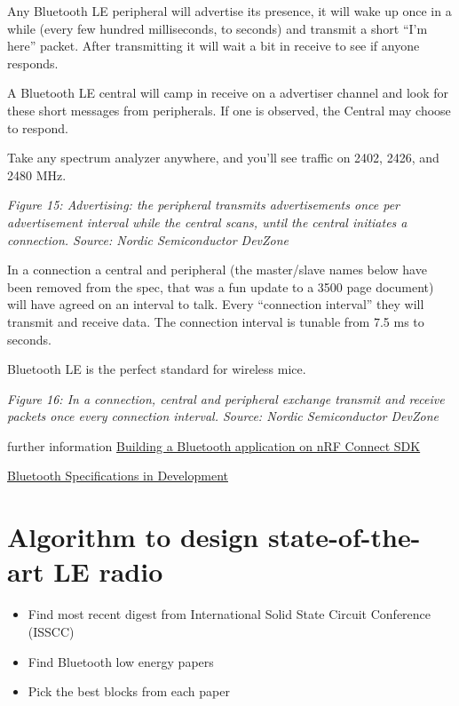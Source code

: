 Any Bluetooth LE peripheral will advertise its presence, it will wake up
once in a while (every few hundred milliseconds, to seconds) and
transmit a short ``I'm here'' packet. After transmitting it will wait a
bit in receive to see if anyone responds.

A Bluetooth LE central will camp in receive on a advertiser channel and
look for these short messages from peripherals. If one is observed, the
Central may choose to respond.

Take any spectrum analyzer anywhere, and you'll see traffic on 2402,
2426, and 2480 MHz.


{
\centering
{}
}

\emph{Figure 15: Advertising: the peripheral transmits advertisements
once per advertisement interval while the central scans, until the
central initiates a connection. Source: Nordic Semiconductor DevZone}

In a connection a central and peripheral (the master/slave names below
have been removed from the spec, that was a fun update to a 3500 page
document) will have agreed on an interval to talk. Every ``connection
interval'' they will transmit and receive data. The connection interval
is tunable from 7.5 ms to seconds.

Bluetooth LE is the perfect standard for wireless mice.


{
\centering
{}
}

\emph{Figure 16: In a connection, central and peripheral exchange
transmit and receive packets once every connection interval. Source:
Nordic Semiconductor DevZone}

further information
\href{https://devzone.nordicsemi.com/guides/nrf-connect-sdk-guides/b/software/posts/building-a-ble-application-on-ncs-comparing-and-contrasting-to-softdevice-based-ble-applications}{Building
a Bluetooth application on nRF Connect SDK}

\href{https://www.bluetooth.com/specifications/specifications-in-development/}{Bluetooth
Specifications in Development}

\section{Algorithm to design state-of-the-art LE
radio}\label{algorithm-to-design-state-of-the-art-le-radio}

\begin{itemize}
\tightlist
\item
  Find most recent digest from International Solid State Circuit
  Conference (ISSCC)
\item
  Find Bluetooth low energy papers
\item
  Pick the best blocks from each paper
\end{itemize}

